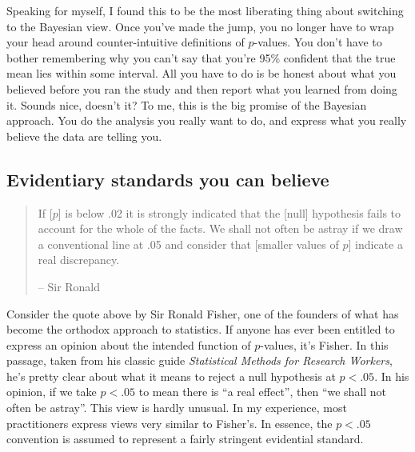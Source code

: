 Speaking for myself, I found this to be the most liberating thing about switching to the Bayesian view. Once you've made the jump, you no longer have to wrap your head around counter-intuitive definitions of $p$-values. You don't have to bother remembering why you can't say that you're 95\% confident that the true mean lies within some interval. All you have to do is be honest about what you believed before you ran the study and then report what you learned from doing it. Sounds nice, doesn't it? To me, this is the big promise of the Bayesian approach. You do the analysis you really want to do, and express what you really believe the data are telling you.


\subsection{Evidentiary standards you can believe}

\begin{quote}
If [$p$] is below .02 it is strongly indicated that the [null] hypothesis fails to account for the whole of the facts. We shall not often be astray if we draw a conventional line at .05 and consider that [smaller values of $p$] indicate a real discrepancy.

\hspace*{2cm} -- Sir Ronald \textcite{Fisher1925}
\end{quote}

Consider the quote above by Sir Ronald Fisher, one of the founders of what has become the orthodox approach to statistics. If anyone has ever been entitled to express an opinion about the intended function of $p$-values, it's Fisher. In this passage, taken from his classic guide {\it Statistical Methods for Research Workers}, he's pretty clear about what it means to reject a null hypothesis at $p<.05$. In his opinion, if we take $p<.05$ to mean there is ``a real effect'', then ``we shall not often be astray''. This view is hardly unusual. In my experience, most practitioners express views very similar to Fisher's. In essence, the $p<.05$ convention is assumed to represent a fairly stringent evidential standard.

